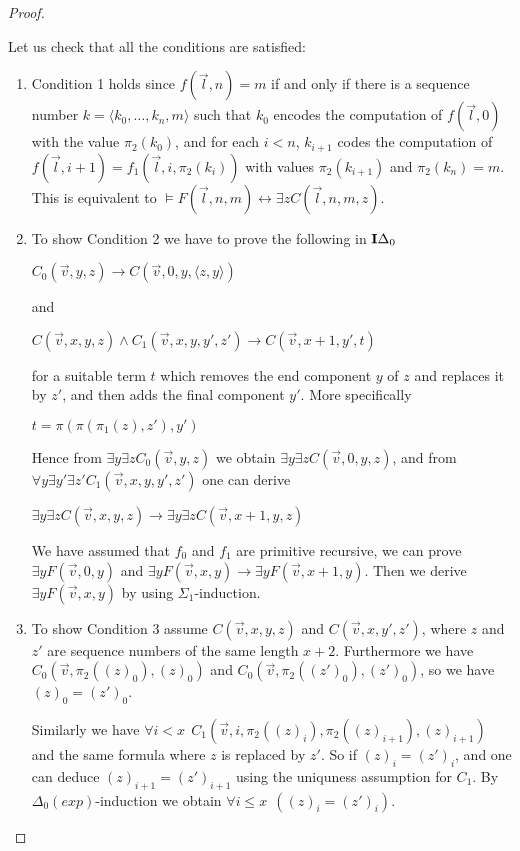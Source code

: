 \documentclass[8pt]{article}
\theoremstyle{definition}
\theoremstyle{definition}
\theoremstyle{definition}
\theoremstyle{definition}
\theoremstyle{definition}
\theoremstyle{definition}
\theoremstyle{definition}
\theoremstyle{definition}
\theoremstyle{definition}
\theoremstyle{definition}
\theoremstyle{definition}
\theoremstyle{definition}
\theoremstyle{definition}
\theoremstyle{question}
\begin{document}
\begin{proof}
\begin{enumerate}
  Let us check that all the conditions are satisfied:
  \begin{enumerate}
    \item Condition 1 holds since $f(\vec{l}, n) = m$ if and only if there is a sequence number
    $k = \langle k_0, \dots, k_n, m \rangle$ such that $k_0$ encodes the computation of 
    $f(\vec{l}, 0)$ with the value $\pi_2(k_0)$, and for each $i < n$, 
    $k_{i + 1}$ codes the computation of $f(\vec{l}, i + 1) = f_1(\vec{l}, i, \pi_2(k_i))$
    with values $\pi_2(k_{i + 1})$ and $\pi_2(k_n) = m$.
    This is equivalent to $\models F(\vec{l}, n, m) \leftrightarrow \exists z C(\vec{l}, n,m, z)$.
    \item To show Condition 2 we have to prove the following in ${\bf I}\Delta_0$
    \begin{center}
      $C_0(\vec{v}, y, z) \to C(\vec{v}, 0, y, \langle z, y \rangle)$
    \end{center}
    and
    \begin{center}
      $C(\vec{v}, x, y, z) \land C_1(\vec{v}, x, y,y',z') \to C(\vec{v}, x + 1, y', t)$
    \end{center}
    for a suitable term $t$ which removes the end component $y$ of $z$ and replaces it by $z'$, 
    and then adds the final component $y'$. More specifically
    \begin{center}
      $t = \pi(\pi(\pi_1(z), z'), y')$
    \end{center}
    Hence from $\exists y \exists z C_0(\vec{v},y,z)$ we obtain 
    $\exists y \exists z C(\vec{v}, 0, y, z)$, and from $\forall y \exists y' \exists z' C_1(\vec{v}, x, y, y', z')$ one can derive
    \begin{center}
      $\exists y \exists z C(\vec{v}, x,y,z) \to \exists y \exists z C(\vec{v}, x + 1, y, z)$
    \end{center}
    We have assumed that $f_0$ and $f_1$ are primitive recursive, we can prove $\exists y F(\vec{v}, 0, y)$
    and $\exists y F(\vec{v}, x, y) \to \exists y F(\vec{v}, x + 1, y)$.
    Then we derive $\exists y F(\vec{v}, x, y)$ by using $\Sigma_1$-induction.
    \item To show Condition 3 assume $C(\vec{v}, x, y, z)$ and $C(\vec{v}, x, y',z')$, where
    $z$ and $z'$ are sequence numbers of the same length $x + 2$.
    Furthermore we have $C_0(\vec{v}, \pi_2((z)_0), (z)_0)$
    and $C_0(\vec{v}, \pi_2((z')_0), (z')_0)$, so we have $(z)_0 = (z')_0$.

    Similarly we have $\forall i < x \:\: C_1(\vec{v}, i, \pi_2((z)_i), \pi_2((z)_{i + 1}), (z)_{i + 1})$
    and the same formula where $z$ is replaced by $z'$.
    So if $(z)_i = (z')_i$, and one can deduce $(z)_{i + 1} = (z')_{i + 1}$ using the uniquness assumption
    for $C_1$. By $\Delta_0(exp)$-induction we obtain $\forall i \leq x \:\: ((z)_i = (z')_i)$.


\end{enumerate}
\end{enumerate}
\end{proof}
\end{document}
